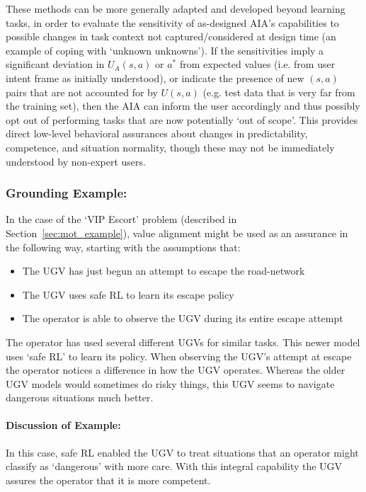 These methods can be more generally adapted and developed beyond learning tasks, in order to evaluate the sensitivity of as-designed AIA's capabilities to possible changes in task context not captured/considered at design time (an example of coping with `unknown unknowns').  
If the sensitivities imply a significant deviation in $U_A(s,a)$ or $a^*$ from expected values (i.e. from user intent frame as initially understood), or indicate the presence of new $(s,a)$ pairs that are not accounted for by $U(s,a)$ (e.g. test data that is very far from the training set), then the AIA can inform the user accordingly and thus possibly opt out of performing tasks that are now potentially `out of scope'. This provides direct low-level behavioral assurances about changes in predictability, competence, and situation normality, though these may not be immediately understood by non-expert users. 

\subsubsection{Grounding Example:}
In the case of the `VIP Escort' problem (described in Section~\ref{sec:mot_example}), value alignment might be used as an assurance in the following way, starting with the assumptions that:

\begin{itemize}
    \item The UGV has just begun an attempt to escape the road-network
    \item The UGV uses safe RL to learn its escape policy
    \item The operator is able to observe the UGV during its entire escape attempt
\end{itemize}

The operator has used several different UGVs for similar tasks. This newer model uses `safe RL' to learn its policy. When observing the UGV's attempt at escape the operator notices a difference in how the UGV operates. Whereas the older UGV models would sometimes do risky things, this UGV seems to navigate dangerous situations much better. 

\paragraph{\textbf{Discussion of Example:}} In this case, safe RL enabled the UGV to treat situations that an operator might classify as `dangerous' with more care. With this integral capability the UGV assures the operator that it is more competent.
